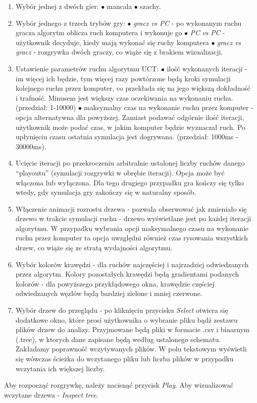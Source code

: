 \documentclass{article}
\begin{document}
\begin{enumerate}
	\item Wybór jednej z dwóch gier:
	\subitem $\bullet$ mancala
	\subitem $\bullet$ szachy.\\
	\item Wybór jednego z trzech trybów gry:
	\subitem $\bullet$ \textit{gracz vs PC} - po wykonanym ruchu gracza algorytm oblicza ruch komputera i wykonuje go
	\subitem $\bullet$ \textit{PC vs PC }- użytkownik decyduje, kiedy mają wykonać się ruchy komputera
	\subitem $\bullet$ \textit{gracz vs gracz} - rozgrywka dwóch graczy, co wiąże się z brakiem wizualizacji.\\
	\item Ustawienie parametrów ruchu algorytmu UCT:
	\subitem $\bullet$ ilość wykonanych iteracji - im więcej ich będzie, tym więcej razy powtórzone będą kroki symulacji kolejnego ruchu przez komputer, co przekłada się na jego większą dokładność i trafność. Minusem jest większy czas oczekiwania na wykonaniu ruchu. (przedział: 1-10000)
	\subitem $\bullet$ maksymalny czas na wykonanie ruchu przez komputer - opcja alternatywna dla powyższej. Zamiast podawać odgórnie ilość iteracji, użytkownik może podać czas, w jakim komputer będzie wyznaczał ruch. Po upłynięciu czasu ostatnia symulacja jest dogrywana. (przedział: 1000ms - 30000ms).\\
	\item Ucięcie iteracji po przekroczeniu arbitralnie ustalonej liczby ruchów danego ``playoutu'' (symulacji rozgrywki w obrębie iteracji). Opcja może być włączona lub wyłączona. Dla tego drugiego przypadku gra kończy się tylko wtedy, gdy symulacja gry zakończy się w naturalny sposób.\\
	\item Włączenie animacji rozrostu drzewa - pozwala obserwować jak zmieniało się drzewo w trakcie symulacji ruchu - drzewo wyświetlane jest po każdej iteracji algorytmu. W przypadku wybrania opcji maksymalnego czasu na wykonanie ruchu przez komputer ta opcja uwzględni również czas rysowania wszystkich drzew, co wiąże się ze stratą wydajności algorytmu.\\
	\item Wybór kolorów krawędzi - dla ruchów najczęściej i najrzadziej odwiedzanych przez algorytm. Kolory pozostałych krawędzi będą gradientami podanych kolorów - dla powyższego przykłądowego okna, krawędzie częściej odwiedzanych węzłów będą bardziej zielone i mniej czerwone.\\
	\item Wybór drzew do przeglądu - po kliknięciu przycisku \textit{Select} otwiera się dodatkowe okno, które prosi użytkownika o wybranie pliku bądź zestawu plików drzew do analizy. Przyjmowane będą pliki w formacie .csv i binarnym (.tree), w ktorych dane zapisane będą według ustalonego schematu. Zakładamy poprawność wczytywanych plików. W polu tekstowym wyświetli się wówczas ścieżka do wczytanego pliku lub liczba plików w przypadku wczytania ich większej liczby.\\
\end{enumerate}
Aby rozpocząć rozgrywkę, należy nacisnąć przycisk \textit{Play}. Aby wizualizować wczytane drzewa - \textit{Inspect tree}.
\pagebreak
\end{document}
